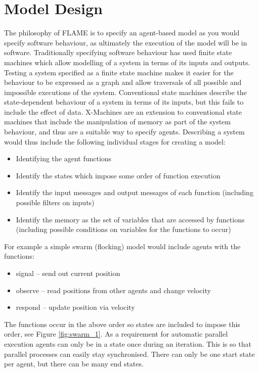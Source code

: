 \section{Model Design}
\label{model_design}

The philosophy of FLAME is to specify an agent-based model as you would specify
software behaviour, as ultimately the execution of the model will be in software.
Traditionally specifying software behaviour has used finite state machines which
allow modelling of a system in terms of its inputs and outputs. Testing a system
specified as a finite state machine makes it easier for the behaviour to be
expressed as a graph and allow traversals of all possible and impossible
executions of the system. Conventional state machines describe the
state-dependent behaviour of a system in terms of its inputs, but this fails to
include the effect of data. X-Machines are an extension to conventional state
machines that include the manipulation of memory as part of the system behaviour,
and thus are a suitable way to specify agents. Describing a system would thus
include the following individual stages for creating a model:

\begin{itemize}
\item Identifying the agent functions
\item Identify the states which impose some order of function execution
\item Identify the input messages and output messages of each function 
(including possible filters on inputs)
\item Identify the memory as the set of variables that are accessed by
functions (including possible conditions on variables for the functions to
occur)
\end{itemize}

For example a simple swarm (flocking) model would include agents with the
functions:

\begin{itemize}
\item signal -- send out current position
\item observe -- read positions from other agents and change velocity
\item respond -- update position via velocity
\end{itemize}

The functions occur in the above order so states are included to impose this
order, see Figure \ref{fig:swarm_1}. As a requirement for automatic parallel
execution agents can only be in a state once during an iteration. This is so that
parallel processes can easily stay synchronised. There can only be one start
state per agent, but there can be many end states.

